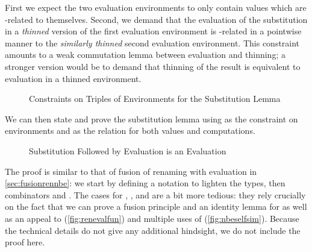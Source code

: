 First we expect the two evaluation environments to only contain  values
which are -related to themselves. Second, we demand that the evaluation of
the substitution in a \emph{thinned} version of the first evaluation environment
is -related in a pointwise manner to the \emph{similarly thinned}
second evaluation environment. This constraint amounts to a weak commutation lemma
between evaluation and thinning; a stronger version would be to demand that thinning
of the result is equivalent to evaluation in a thinned environment.

\begin{figure}[h]
\caption{Constraints on Triples of Environments for the Substitution Lemma}
\end{figure}

We can then state and prove the substitution lemma using  as the constraint
on environments and  as the relation for both values and computations.

\begin{figure}[h]
\caption{Substitution Followed by Evaluation is an Evaluation}
\end{figure}

The proof is similar to that of fusion of renaming with evaluation in
\cref{sec:fusionrennbe}: we start by defining a notation  to lighten the
types, then combinators  and . The cases for
, , and  are a bit more tedious:
they rely crucially on the fact that we can prove a fusion principle and an identity
lemma for  as well as an appeal to 
(\cref{fig:renevalfun}) and multiple uses of 
(\cref{fig:nbeselfsim}). Because the technical details do not give any additional
hindsight, we do not include the proof here.
